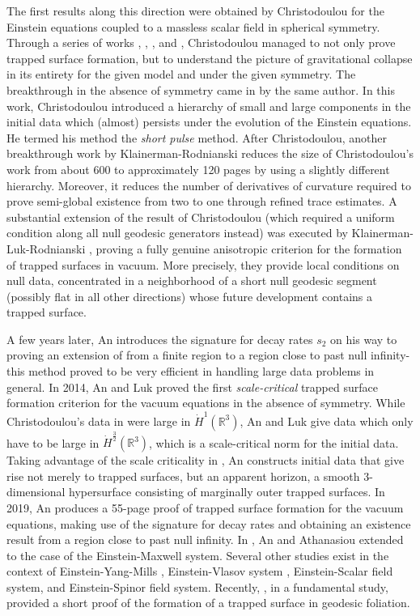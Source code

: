 \documentclass{amsart}
\begin{document}
\noindent The first results along this direction were obtained by Christodoulou for the Einstein equations coupled to a massless scalar field in spherical symmetry. Through a series of works \cite{C91}, \cite{C93}, \cite{C94}, and \cite{C99}, Christodoulou managed to not only prove trapped surface formation, but to understand the picture of gravitational collapse in its entirety for the given model and under the given symmetry. The breakthrough in the absence of symmetry came in \cite{christodoulou} by the same author. In this work, Christodoulou introduced a hierarchy of small and large components in the initial data which (almost) persists under the evolution of the Einstein equations. He termed his method the \textit{short pulse} method. After Christodoulou, another breakthrough work by Klainerman-Rodnianski \cite{Kl-Rod} reduces the size of Christodoulou's work from about 600 to approximately 120 pages by using a slightly different hierarchy. Moreover, it reduces the number of derivatives of curvature required to prove semi-global existence from two to one through refined trace estimates. A substantial extension of the result of Christodoulou (which required a uniform condition along all null geodesic generators instead) was executed by Klainerman-Luk-Rodnianski \cite{LKR}, proving a fully genuine anisotropic criterion for the formation of trapped surfaces in vacuum. More precisely, they provide local conditions on null data, concentrated in a neighborhood of a short null geodesic segment (possibly flat in all other directions) whose future development contains a trapped surface.

\noindent A few years later, An  \cite{AnThesis} introduces the signature for decay rates $s_2$ on his way to proving an extension of \cite{Kl-Rod} from a finite region to a region close to past null infinity-this method proved to be very efficient in handling large data problems in general. In 2014, An and Luk \cite{AL17} proved the first \textit{scale-critical} trapped surface formation criterion for the vacuum equations in the absence of symmetry. While Christodoulou's data in \cite{christodoulou} were large in $\dot{H}^1(\mathbb{R}^3)$, An and Luk give data which only have to be large in $\dot{H}^{\frac{3}{2}}(\mathbb{R}^3)$, which is a scale-critical norm for the initial data. Taking advantage of the scale criticality in \cite{AL17}, An \cite{A17} constructs initial data that give rise not merely to trapped surfaces, but an apparent horizon, a smooth 3-dimensional hypersurface consisting of marginally outer trapped surfaces. In 2019, An \cite{A19} produces a 55-page proof of trapped surface formation for the vacuum equations, making use of the signature for decay rates and obtaining an existence result from a region close to past null infinity. In \cite{AnAth}, An and Athanasiou extended \cite{A19} to the case of the Einstein-Maxwell system.
Several other studies exist in the context of Einstein-Yang-Mills \cite{NMY1}, Einstein-Vlasov system \cite{dafermos,andr1,andr2,NMY2}, Einstein-Scalar field system, and Einstein-Spinor field system. Recently, \cite{chen}, in a fundamental study, provided a short proof of the formation of a trapped surface in geodesic foliation.  
\end{document}
